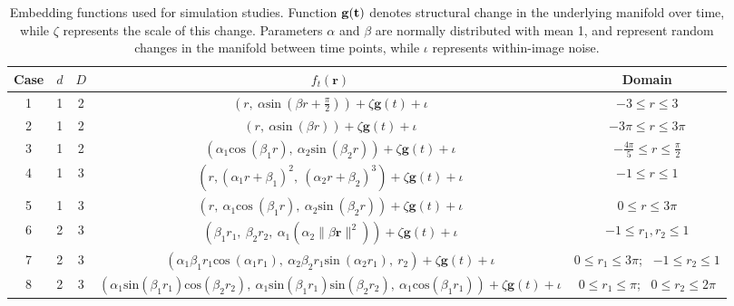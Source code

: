 \documentclass[12pt]{article}
\theoremstyle{definition}
\begin{document}
\begin{table}[ht]
\small
  \centering
  \begin{tabular}{|c c c c c|}
    \hline
    Case & $d$ & $D$ & $f_t(\mathbf{r})$ & Domain \\
    \hline
    1 & 1 & 2 & $\left(r, \ \alpha \text{sin} \ (\beta r + \frac{\pi}{2})\right) + \zeta\mathbf{g}(t) + \iota$ & $-3 \leq r \leq 3$ \\
    2 & 1 & 2 & $\left(r, \ \alpha\text{sin} \ (\beta r)\right) + \zeta\mathbf{g}(t) + \iota$ & $-3\pi \leq r \leq 3\pi$ \\
    3 & 1 & 2 & $\left(\alpha_1 \text{cos} \ (\beta_1 r), \ \alpha_2\text{sin} \ (\beta_2 r)\right) + \zeta\mathbf{g}(t) + \iota$ & $-\frac{4\pi}{5} \leq r \leq \frac{\pi}{2}$ \\
    4 & 1 & 3 & $\left(r, (\alpha_1r + \beta_1)^2, \ (\alpha_2r + \beta_2)^3\right) + \zeta\mathbf{g}(t) + \iota$ & $-1 \leq r \leq 1$ \\
    5 & 1 & 3 & $\left(r, \ \alpha_1\text{cos} \ (\beta_1 r), \ \alpha_2\text{sin} \ (\beta_2 r) \right) + \zeta\mathbf{g}(t) + \iota$ & $0 \leq r \leq 3\pi$ \\
    6 & 2 & 3 & $\left(\beta_1r_1, \ \beta_2r_2, \ \alpha_1(\alpha_2\|\beta\mathbf{r}\|^2)\right) + \zeta\mathbf{g}(t) + \iota$ & $-1 \leq r_1, r_2 \leq 1$\\
    7 & 2 & 3 & $\left(\alpha_1\beta_1r_1\text{cos} \ (\alpha_1r_1), \ \alpha_2\beta_2r_1\text{sin} \ (\alpha_2r_1), \ r_2\right) + \zeta\mathbf{g}(t) + \iota$ & $0 \leq r_1 \leq 3\pi$; \ $-1 \leq r_2 \leq 1$\\
    8 & 2 & 3 & $\left(\alpha_1\text{sin}(\beta_1r_1)\text{cos}(\beta_2r_2), \ \alpha_1\text{sin}(\beta_1r_1)\text{sin}(\beta_2r_2), \ \alpha_1\text{cos}(\beta_1r_1)\right) + \zeta\mathbf{g}(t) + \iota$ & $0 \leq r_1 \leq \pi$; \ $0 \leq r_2 \leq 2\pi$\\
    \hline
  \end{tabular}
  \caption{Embedding functions used for simulation studies. Function $\bf{g}(t)$ denotes structural change in the underlying manifold over time, while $\zeta$ represents the scale of this change. Parameters $\alpha$ and $\beta$ are normally distributed with mean 1, and represent random changes in the manifold between time points, while $\iota$ represents within-image noise.}
  \label{table:simulation_embeddings}
\end{table}
\end{document}
